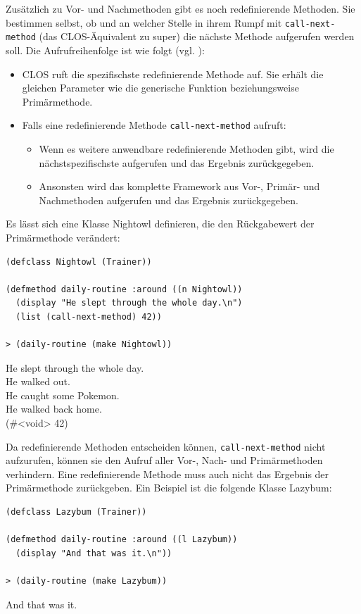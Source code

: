 Zusätzlich zu Vor- und Nachmethoden gibt es noch redefinierende Methoden. Sie bestimmen selbst, ob und an welcher Stelle in ihrem Rumpf mit \texttt{call-next-method} (das CLOS-Äquivalent zu super) die nächste Methode aufgerufen werden soll. Die Aufrufreihenfolge ist wie folgt (vgl. \cite[S.103]{keene}):
\begin{itemize}
 \item CLOS ruft die spezifischste redefinierende Methode auf. Sie erhält die gleichen Parameter wie die generische Funktion beziehungsweise Primärmethode.
 \item Falls eine redefinierende Methode \texttt{call-next-method} aufruft:
 \begin{itemize} \vspace{-0.3cm}
  \item Wenn es weitere anwendbare redefinierende Methoden gibt, wird die nächstspezifischste aufgerufen und das Ergebnis zurückgegeben. \vspace{-0.3cm}
  \item Ansonsten wird das komplette Framework aus Vor-, Primär- und Nachmethoden aufgerufen und das Ergebnis zurückgegeben.
 \end{itemize}
\end{itemize}

Es lässt sich eine Klasse Nightowl definieren, die den Rückgabewert der Primärmethode verändert:

\begin{lstlisting}
(defclass Nightowl (Trainer))

(defmethod daily-routine :around ((n Nightowl))
  (display "He slept through the whole day.\n")
  (list (call-next-method) 42))
  
> (daily-routine (make Nightowl))
\end{lstlisting}
{\routput He slept through the whole day.\\
\phantom{.}He walked out.\\
\phantom{.}He caught some Pokemon.\\
\phantom{.}He walked back home.\\
\phantom{.}(\#<void> 42)}

Da redefinierende Methoden entscheiden können, \texttt{call-next-method} nicht aufzurufen, können sie den Aufruf aller Vor-, Nach- und Primärmethoden verhindern. Eine redefinierende Methode muss auch nicht das Ergebnis der Primärmethode zurückgeben. Ein Beispiel ist die folgende Klasse Lazybum:

\begin{lstlisting}
(defclass Lazybum (Trainer))

(defmethod daily-routine :around ((l Lazybum))
  (display "And that was it.\n"))
  
> (daily-routine (make Lazybum))
\end{lstlisting}
{\routput And that was it.}

